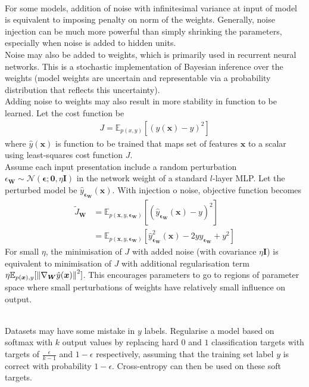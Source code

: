 \begin{remark} \\
For some models, addition of noise with infinitesimal variance at input of model is equivalent to imposing penalty on norm of the weights. Generally, noise injection can be much more powerful than simply shrinking the parameters, especially when noise is added to hidden units.\\
Noise may also be added to weights, which is primarily used in recurrent neural networks. This is a stochastic implementation of Bayesian inference over the weights (model weights are uncertain and representable via a probability distribution that reflects this uncertainty).\\
Adding noise to weights may also result in more stability in function to be learned. Let the cost function be 
\begin{align}
J = \mathbb{E}_{p(x,y)}[(\hat{y}(\bm{x}) - y)^2] \nonumber
\end{align}
where $\hat{y}(\bm{x})$ is function to be trained that maps set of features $\bm{x}$ to a scalar using least-squares cost function $J$.\\
Assume each input presentation include a random perturbation $\epsilon_{\bm{W}} \sim \mathcal{N}(\bm{\epsilon}; \bm{0}, \eta \bm{I})$ in the network weight of a standard $l$-layer MLP. Let the perturbed model be $\hat{y}_{\bm{\epsilon}_{\bm{W}}}(\bm{x})$. With injection o noise, objective function becomes
\begin{align}
\tilde{J}_{\bm{W}} &= \mathbb{E}_{p(\bm{x}, y, \bm{\epsilon}_{\bm{W}})}\left[(\hat{y}_{\bm{\epsilon}_{\bm{W}}}(\bm{x}) - y)^2 \right] \nonumber \\
&= \mathbb{E}_{p(\bm{x}, y, \bm{\epsilon}_{\bm{W}})} \left[\hat{y}^2_{\bm{\epsilon}_{\bm{W}}}(\bm{x}) - 2 y \hat{y}_{\bm{\epsilon}_{\bm{W}}} + y^2 \right] \nonumber
\end{align}
For small $\eta$, the minimisation of $J$ with added noise (with covariance $\eta \bm{I}$) is equivalent to minimisation of $J$ with additional regularisation term $\eta \mathbb{E}_{p(\bm{x}), y} [\left\lVert\nabla_{\bm{W}} \hat{y}(\bm{x})\right\rVert^2]$. This encourages parameters to go to regions of parameter space where small perturbations of weights have relatively small influence on output.
\end{remark}

\begin{remark} \\
Datasets may have some mistake in $y$ labels. Regularise a model based on softmax with $k$ output values by replacing hard $0$ and $1$ classification targets with targets of $\frac{\epsilon}{k-1}$ and $1-\epsilon$ respectively, assuming that the training set label $y$ is correct with probability $1- \epsilon$. Cross-entropy can then be used on these soft targets.
\end{remark}

